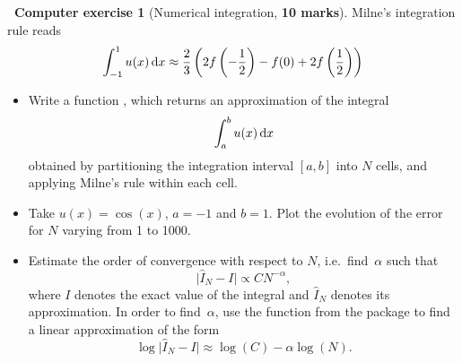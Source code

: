 \documentclass[11pt]{article}
\theoremstyle{definition}
\newtheorem{compexercise}{{\normalfont \faLaptop}~Computer exercise}
\renewcommand{\mymarks}[1]{\textbf{#1 marks}}
\begin{document}
\newpage
\begin{compexercise}
    [Numerical integration, \mymarks{10}]
    Milne's integration rule reads
    \[
        \int_{-1}^{1} u(x) \, \mathrm d x
        \approx \frac{2}{3} \left( 2 f\left(-\frac{1}{2}\right) - f(0) + 2 f\left(\frac{1}{2}\right) \right)
    \]
    \begin{itemize}

        \item
            Write a function ,
            which returns an approximation of the integral
            \[
                \int_{a}^{b} u(x) \, \mathrm d x
            \]
            obtained by partitioning the integration interval $[a, b]$ into $N$ cells,
            and applying Milne's rule within each cell.

        \item
            Take $u(x) = \cos(x)$, $a = -1$ and $b = 1$.
            Plot the evolution of the error for $N$ varying from 1 to 1000.

        \item
            Estimate the order of convergence with respect to $N$, i.e.\ find~$\alpha$ such that
            \[
                \lvert \widehat I_{N} - I \rvert \propto C N^{-\alpha},
            \]
            where $I$ denotes the exact value of the integral
            and $\widehat I_{N}$ denotes its approximation.
            In order to find~$\alpha$,
            use the function  from the  package to find a linear approximation
            of the form
            \[
                \log \lvert \widehat I_{N} - I \rvert \approx \log (C) - \alpha \log(N).
            \]
    \end{itemize}
\end{compexercise}
\end{document}
